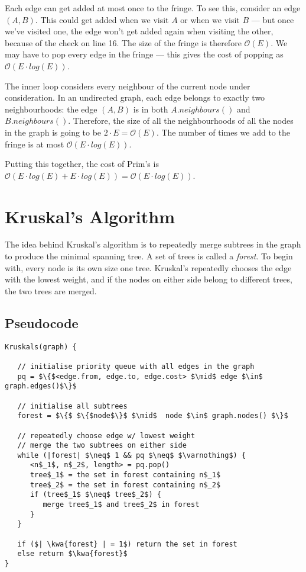 \documentclass[a4paper,12pt]{article}
\newcommand{\kwa}[1]{\mathtt{#1}}
\begin{document}
Each edge can get added at most once to the fringe. To see this, consider an edge $(A, B)$. This could get added when we visit $A$ or when we visit $B$ --- but once we've visited one, the edge won't get added again when visiting the other, because of the check on line 16. The size of the fringe is therefore $\mathcal{O}(E)$. We may have to pop every edge in the fringe --- this gives the cost of popping as $\mathcal{O}(E \cdot log(E))$.

The inner loop considers every neighbour of the current node under consideration. In an undirected graph, each edge belongs to exactly two neighbourhoods: the edge $(A,B)$ is in both $A.neighbours()$ and $B.neighbours()$. Therefore, the size of all the neighbourhoods of all the nodes in the graph is going to be $2 \cdot E = \mathcal{O}(E)$. The number of times we add to the fringe is at most $\mathcal{O}(E \cdot log(E))$.

Putting this together, the cost of Prim's is $\mathcal{O}(E \cdot log(E) + E \cdot log(E)) = \mathcal{O}(E \cdot log(E))$.

\section{Kruskal's Algorithm}

The idea behind Kruskal's algorithm is to repeatedly merge subtrees in the graph to produce the minimal spanning tree. A set of trees is called a \textit{forest}. To begin with, every node is its own size one tree. Kruskal's repeatedly chooses the edge with the lowest weight, and if the nodes on either side belong to different trees, the two trees are merged.

\subsection{Pseudocode}

\begin{lstlisting}
Kruskals(graph) {

   // initialise priority queue with all edges in the graph
   pq = $\{$<edge.from, edge.to, edge.cost> $\mid$ edge $\in$ graph.edges()$\}$
  
   // initialise all subtrees
   forest = $\{$ $\{$node$\}$ $\mid$  node $\in$ graph.nodes() $\}$

   // repeatedly choose edge w/ lowest weight
   // merge the two subtrees on either side
   while (|forest| $\neq$ 1 && pq $\neq$ $\varnothing$) {
      <n$_1$, n$_2$, length> = pq.pop()
      tree$_1$ = the set in forest containing n$_1$
      tree$_2$ = the set in forest containing n$_2$
      if (tree$_1$ $\neq$ tree$_2$) {
         merge tree$_1$ and tree$_2$ in forest
      }
   }
   
   if ($| \kwa{forest} | = 1$) return the set in forest
   else return $\kwa{forest}$
}

\end{lstlisting}
\end{document}

